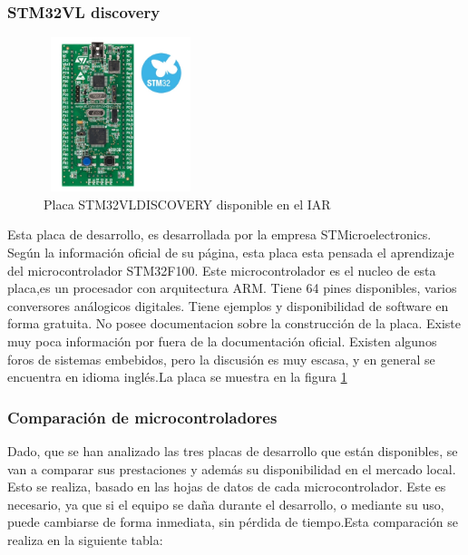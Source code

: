 \subsubsection{STM32VL discovery}

\begin{figure}
	\includegraphics[width=0.4\textwidth,height=45mm] {stm32vl}
	\caption{Placa STM32VLDISCOVERY disponible en el IAR}
	\label{fig:stm32}
\end{figure}

Esta placa de desarrollo, es desarrollada por la empresa STMicroelectronics. Según la información oficial de su página, esta placa esta pensada el aprendizaje del microcontrolador STM32F100. Este microcontrolador es el nucleo de esta placa,es un procesador con arquitectura ARM. Tiene 64 pines disponibles, varios conversores análogicos digitales. Tiene ejemplos y disponibilidad de software en forma gratuita. No posee documentacion sobre la construcción de la placa. Existe muy poca información por fuera de la documentación oficial. Existen algunos foros de sistemas embebidos, pero la discusión es muy escasa, y en general se encuentra en idioma inglés.La placa se muestra en la figura \ref{fig:stm32}








\subsubsection{Comparación de microcontroladores} 
Dado, que se han analizado las tres placas de desarrollo que están disponibles, se van a comparar sus prestaciones y además su disponibilidad en el mercado local. Esto se realiza, basado en las hojas de datos de cada microcontrolador. Este es necesario, ya que si el equipo se daña durante el desarrollo, o mediante su uso, puede cambiarse de forma inmediata, sin pérdida de tiempo.Esta comparación se realiza en la siguiente tabla:  

